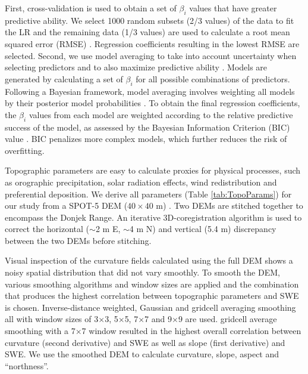 \documentclass[twocolumn, letterpaper]{igs}
\begin{document}
First, cross-validation is used to obtain a set of $\beta_i$ values that have greater predictive ability. We select 1000 random subsets (2/3 values) of the data to fit the LR and the remaining data (1/3 values) are used to calculate a root mean squared error (RMSE) \citep{Kohavi1995}. Regression coefficients resulting in the lowest RMSE are selected. Second, we use model averaging to take into account uncertainty when selecting predictors and to also maximize predictive ability \citep{Madigan1994}. Models are generated by calculating a set of $\beta_i$ for all possible combinations of predictors. Following a Bayesian framework, model averaging involves weighting all models by their posterior model probabilities \citep{Raftery1997}. To obtain the final regression coefficients, the $\beta_i$ values from each model are weighted according to the relative predictive success of the model, as assessed by the Bayesian Information Criterion (BIC) value \citep{Burnham2004}. BIC penalizes more complex models, which further reduces the risk of overfitting.

Topographic parameters are easy to calculate proxies for physical processes, such as orographic precipitation, solar radiation effects, wind redistribution and preferential deposition. We derive all parameters (Table \ref{tab:TopoParams}) for our study from a SPOT-5 DEM ($40\times40$ m) \citep{Korona2009}. Two DEMs are stitched together to encompass the Donjek Range. An iterative 3D-coregistration algorithm \citep{Berthier2007} is used to correct the horizontal ($\sim$2 m E, $\sim$4 m N) and vertical (5.4 m) discrepancy between the two DEMs before stitching. 

Visual inspection of the curvature fields calculated using the full DEM shows a noisy spatial distribution that did not vary smoothly. To smooth the DEM, various smoothing algorithms and window sizes are applied and the combination that produces the highest correlation between topographic parameters and SWE is chosen. Inverse-distance weighted, Gaussian and gridcell averaging smoothing all with window sizes of 3$\times$3, 5$\times$5, 7$\times$7 and 9$\times$9 are used. gridcell average smoothing with a 7$\times$7 window resulted in the highest overall correlation between curvature (second derivative) and SWE as well as slope (first derivative) and SWE. We use the smoothed DEM to calculate curvature, slope, aspect and ``northness''.
\end{document}
